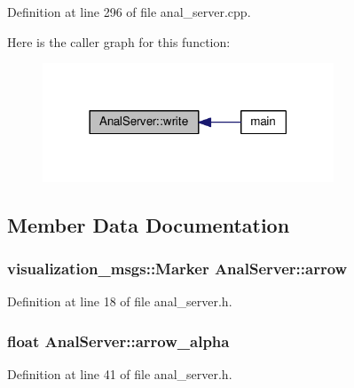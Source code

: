 Definition at line 296 of file anal\+\_\+server.\+cpp.



Here is the caller graph for this function\+:
\nopagebreak
\begin{figure}[H]
\begin{center}
\leavevmode
\includegraphics[width=246pt]{class_anal_server_a3b6dc7f5258edba7c6e40e759a532445_icgraph}
\end{center}
\end{figure}




\subsection{Member Data Documentation}
\subsubsection[{\texorpdfstring{arrow}{arrow}}]{\setlength{\rightskip}{0pt plus 5cm}visualization\+\_\+msgs\+::\+Marker Anal\+Server\+::arrow}\hypertarget{class_anal_server_af86ac23277ff6b551817d7bdb11a8bd0}{}\label{class_anal_server_af86ac23277ff6b551817d7bdb11a8bd0}


Definition at line 18 of file anal\+\_\+server.\+h.

\subsubsection[{\texorpdfstring{arrow\+\_\+alpha}{arrow_alpha}}]{\setlength{\rightskip}{0pt plus 5cm}float Anal\+Server\+::arrow\+\_\+alpha}\hypertarget{class_anal_server_acfb15e946304bbb248e51470692fa209}{}\label{class_anal_server_acfb15e946304bbb248e51470692fa209}


Definition at line 41 of file anal\+\_\+server.\+h.

